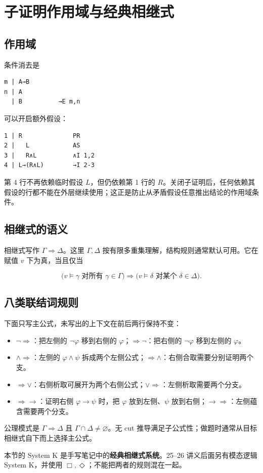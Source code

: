 \section{子证明作用域与经典相继式}


\subsection{作用域}


条件消去是

\begin{verbatim}
m | A→B
n | A
  | B          →E m,n
\end{verbatim}


可以开启额外假设：

\begin{verbatim}
1 | R              PR
2 |   L            AS
3 |   R∧L          ∧I 1,2
4 | L→(R∧L)        →I 2-3
\end{verbatim}


第 4 行不再依赖临时假设 $L$，但仍依赖第 1 行的 $R$。关闭子证明后，任何依赖其假设的行都不能在外层继续使用；这正是防止从矛盾假设任意推出结论的作用域条件。

\subsection{相继式的语义}


相继式写作 $\Gamma\Rightarrow\Delta$。这里 $\Gamma,\Delta$ 按有限多重集理解，结构规则通常默认可用。它在赋值 $v$ 下为真，当且仅当

\[
\bigl(v\models\gamma\text{ 对所有 }\gamma\in\Gamma\bigr)
\Longrightarrow
\bigl(v\models\delta\text{ 对某个 }\delta\in\Delta\bigr).
\]

\subsection{八类联结词规则}


下面只写主公式，未写出的上下文在前后两行保持不变：

\begin{itemize}
\item $\neg\Rightarrow$：把左侧的 $\neg\varphi$ 移到右侧的 $\varphi$；$\Rightarrow\neg$：把右侧的 $\neg\varphi$ 移到左侧的 $\varphi$。
\item $\land\Rightarrow$：左侧的 $\varphi\land\psi$ 拆成两个左侧公式；$\Rightarrow\land$：右侧合取需要分别证明两个支。
\item $\Rightarrow\lor$：右侧析取可展开为两个右侧公式；$\lor\Rightarrow$：左侧析取需要两个分支。
\item $\Rightarrow\to$：证明右侧 $\varphi\to\psi$ 时，把 $\varphi$ 放到左侧、$\psi$ 放到右侧；$\to\Rightarrow$：左侧蕴含需要两个分支。
\end{itemize}


公理模式是 $\Gamma\Rightarrow\Delta$ 且 $\Gamma\cap\Delta\ne\varnothing$。无 cut 推导满足子公式性；做题时通常从目标相继式自下而上选择主公式。

本节的 System K 是手写笔记中的\textbf{经典相继式系统}。25–26 讲义后面另有模态逻辑 System K，并使用 $\Box,\Diamond$；不能把两者的规则混在一起。
